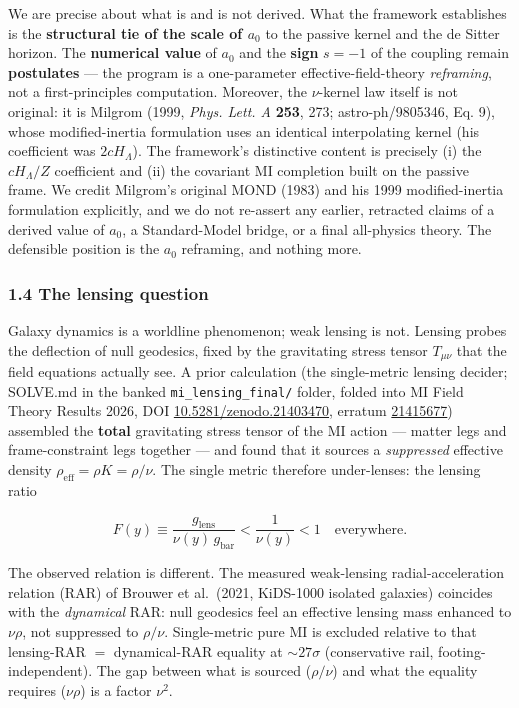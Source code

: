 \documentclass[
]{article}
\begin{document}
We are precise about what is and is not derived. What the framework
establishes is the \textbf{structural tie of the scale of \(a_0\)} to
the passive kernel and the de Sitter horizon. The \textbf{numerical
value} of \(a_0\) and the \textbf{sign} \(s=-1\) of the coupling remain
\textbf{postulates} --- the program is a one-parameter
effective-field-theory \emph{reframing}, not a first-principles
computation. Moreover, the \(\nu\)-kernel law itself is not original: it
is Milgrom (1999, \emph{Phys. Lett. A} \textbf{253}, 273;
astro-ph/9805346, Eq. 9), whose modified-inertia formulation uses an
identical interpolating kernel (his coefficient was \(2cH_\Lambda\)).
The framework's distinctive content is precisely (i) the
\(cH_\Lambda/Z\) coefficient and (ii) the covariant MI completion built
on the passive frame. We credit Milgrom's original MOND (1983) and his
1999 modified-inertia formulation explicitly, and we do not re-assert
any earlier, retracted claims of a derived value of \(a_0\), a
Standard-Model bridge, or a final all-physics theory. The defensible
position is the \(a_0\) reframing, and nothing more.

\subsubsection{1.4 The lensing question}\label{the-lensing-question}

Galaxy dynamics is a worldline phenomenon; weak lensing is not. Lensing
probes the deflection of null geodesics, fixed by the gravitating stress
tensor \(T_{\mu\nu}\) that the field equations actually see. A prior
calculation (the single-metric lensing decider; SOLVE.md in the banked
\texttt{mi\_lensing\_final/} folder, folded into MI Field Theory Results
2026, DOI
\href{https://doi.org/10.5281/zenodo.21403470}{10.5281/zenodo.21403470},
erratum \href{https://doi.org/10.5281/zenodo.21415677}{21415677})
assembled the \textbf{total} gravitating stress tensor of the MI action
--- matter legs and frame-constraint legs together --- and found that it
sources a \emph{suppressed} effective density
\(\rho_\mathrm{eff}=\rho K = \rho/\nu\). The single metric therefore
under-lenses: the lensing ratio

\[
F(y) \equiv \frac{g_\mathrm{lens}}{\nu(y)\,g_\mathrm{bar}} < \frac{1}{\nu(y)} < 1 \quad \text{everywhere}.
\]

The observed relation is different. The measured weak-lensing
radial-acceleration relation (RAR) of Brouwer et al.~(2021, KiDS-1000
isolated galaxies) coincides with the \emph{dynamical} RAR: null
geodesics feel an effective lensing mass enhanced to \(\nu\rho\), not
suppressed to \(\rho/\nu\). Single-metric pure MI is excluded relative
to that lensing-RAR \(=\) dynamical-RAR equality at \(\sim27\sigma\)
(conservative rail, footing-independent). The gap between what is
sourced (\(\rho/\nu\)) and what the equality requires (\(\nu\rho\)) is a
factor \(\nu^2\).
\end{document}
